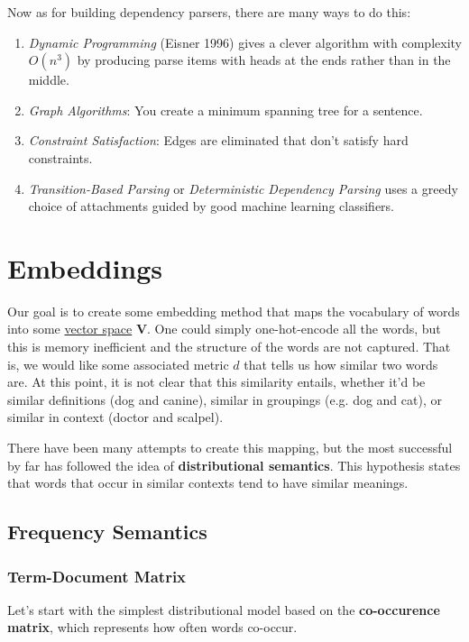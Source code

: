 \documentclass{article}
\begin{document}
      Now as for building dependency parsers, there are many ways to do this: 
      \begin{enumerate}
        \item \textit{Dynamic Programming} (Eisner 1996) gives a clever algorithm with complexity $O(n^3)$ by producing parse items with heads at the ends rather than in the middle. 
        \item \textit{Graph Algorithms}: You create a minimum spanning tree for a sentence. 
        \item \textit{Constraint Satisfaction}: Edges are eliminated that don't satisfy hard constraints. 
        \item \textit{Transition-Based Parsing} or \textit{Deterministic Dependency Parsing} uses a greedy choice of attachments guided by good machine learning classifiers. 
      \end{enumerate}

\section{Embeddings}

    Our goal is to create some embedding method that maps the vocabulary of words into some \hyperref[lin-def:vector-space]{vector space} $\mathbf{V}$. One could simply one-hot-encode all the words, but this is memory inefficient and the structure of the words are not captured. That is, we would like some associated metric $d$ that tells us how similar two words are. At this point, it is not clear that this similarity entails, whether it'd be similar definitions (dog and canine), similar in groupings (e.g. dog and cat), or similar in context (doctor and scalpel). 

    There have been many attempts to create this mapping, but the most successful by far has followed the idea of \textbf{distributional semantics}. This hypothesis states that words that occur in similar contexts tend to have similar meanings. 

  \subsection{Frequency Semantics}

    \subsubsection{Term-Document Matrix}

      Let's start with the simplest distributional model based on the \textbf{co-occurence matrix}, which represents how often words co-occur. 
\end{document}
